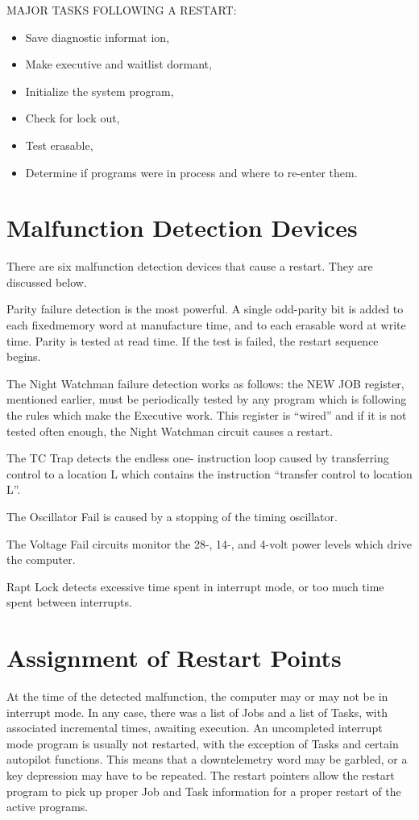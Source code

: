 \documentclass[oxford]{ahsan}
\begin{document}
MAJOR TASKS FOLLOWING A RESTART: 
\begin{itemize}
    \item Save diagnostic informat ion, 
    \item Make executive and waitlist dormant, 
    \item Initialize the system program, 
    \item Check for lock out, 
    \item Test erasable, 
    \item Determine if programs were in process and where to re-enter them.
\end{itemize}

\section{Malfunction Detection Devices}

There are six malfunction detection devices that cause a restart. They are discussed
below.

Parity failure detection is the most powerful. A single odd-parity bit is added to each
fixedmemory word at manufacture time, and to each erasable word at write time. Parity
is tested at read time. If the test is failed, the restart sequence begins.

The Night Watchman failure detection works as follows: the NEW JOB register, mentioned
earlier, must be periodically tested by any program which is following the rules which
make the Executive work. This register is “wired” and if it is not tested often enough,
the Night Watchman circuit causes a restart.

The TC Trap detects the endless one- instruction loop caused by transferring control to
a location L which contains the instruction “transfer control to location L”.

The Oscillator Fail is caused by a stopping of the timing oscillator.

The Voltage Fail circuits monitor the 28-, 14-, and 4-volt power levels which drive the
computer.

Rapt Lock detects excessive time spent in interrupt mode, or too much time spent
between interrupts.


\section{Assignment of Restart Points}

At the time of the detected malfunction, the computer may or may not be in interrupt
mode. In any case, there was a list of Jobs and a list of Tasks, with associated
incremental times, awaiting execution. An uncompleted interrupt mode program is
usually not restarted, with the exception of Tasks and certain autopilot functions.
This means that a downtelemetry word may be garbled, or a key depression may have to be
repeated. The restart pointers allow the restart program to pick up proper Job and Task
information for a proper restart of the active programs.
\end{document}

